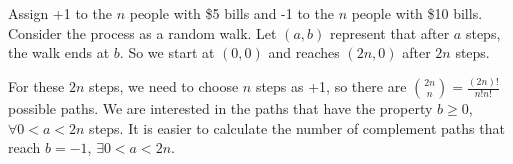\begin{solution}[\bf Solution.]
Assign +1 to the $n$ people with \$5 bills and -1 to the $n$ people with \$10 bills. Consider the process as a random walk. Let $(a,b)$ represent that after $a$ steps, the walk ends at $b$. So we
start at $(0,0)$ and reaches $(2n,0)$ after $2n$ steps.

For these $2n$ steps, we need to choose $n$ steps as +1, so there are $\binom{2n}{n} = \frac{(2n)!}{n!n!}$ possible paths. We are interested in the paths that have the property $b\geq 0$, $\forall
0<a<2n$ steps. It is easier to calculate the number of complement paths that reach $b=-1$, $\exists 0<a<2n$.

\end{solution}
